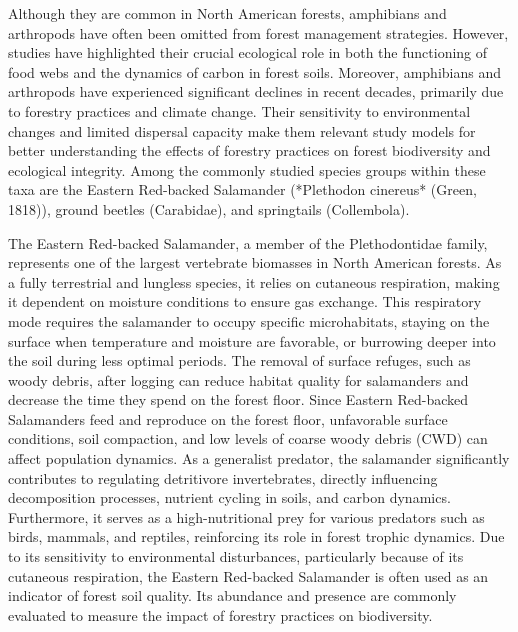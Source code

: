 Although they are common in North American forests, amphibians and arthropods have often been omitted from forest management strategies. 
However, studies have highlighted their crucial ecological role in both the functioning of food webs and the dynamics of carbon in forest soils. 
Moreover, amphibians and arthropods have experienced significant declines in recent decades, primarily due to forestry practices and climate change. 
Their sensitivity to environmental changes and limited dispersal capacity make them relevant study models for better understanding the effects of forestry practices on forest biodiversity and ecological integrity. 
Among the commonly studied species groups within these taxa are the Eastern Red-backed Salamander (*Plethodon cinereus* (Green, 1818)), ground beetles (Carabidae), and springtails (Collembola).

%

The Eastern Red-backed Salamander, a member of the Plethodontidae family, represents one of the largest vertebrate biomasses in North American forests. 
As a fully terrestrial and lungless species, it relies on cutaneous respiration, making it dependent on moisture conditions to ensure gas exchange. 
This respiratory mode requires the salamander to occupy specific microhabitats, staying on the surface when temperature and moisture are favorable, or burrowing deeper into the soil during less optimal periods. 
The removal of surface refuges, such as woody debris, after logging can reduce habitat quality for salamanders and decrease the time they spend on the forest floor. 
Since Eastern Red-backed Salamanders feed and reproduce on the forest floor, unfavorable surface conditions, soil compaction, and low levels of coarse woody debris (CWD) can affect population dynamics. 
As a generalist predator, the salamander significantly contributes to regulating detritivore invertebrates, directly influencing decomposition processes, nutrient cycling in soils, and carbon dynamics. 
Furthermore, it serves as a high-nutritional prey for various predators such as birds, mammals, and reptiles, reinforcing its role in forest trophic dynamics. 
Due to its sensitivity to environmental disturbances, particularly because of its cutaneous respiration, the Eastern Red-backed Salamander is often used as an indicator of forest soil quality. 
Its abundance and presence are commonly evaluated to measure the impact of forestry practices on biodiversity.


